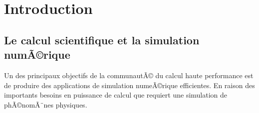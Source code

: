 \chapter{Introduction}
\label{chap:intro}
\minitoc


 \cite{Commowick_MICCAI_2007}
 
 \section{Le calcul scientifique et la simulation numÃ©rique}
Un des principaux objectifs de la communautÃ© du calcul haute performance est de produire des applications de simulation numeÃ©rique efficientes. En raison des importants besoins en puissance de calcul que requiert une simulation de phÃ©nomÃ¨nes physiques.